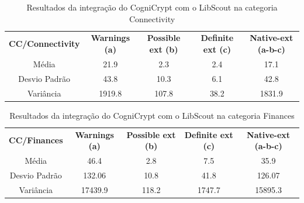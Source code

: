 \begin{table}[!htbp]
  \centering
  \small
  \begin{tabular}{|c|c|c|c|c|}
  
\textbf{CC/Connectivity}   & \textbf{Warnings (a)}   &  \textbf{Possible ext (b)}     &  \textbf{Definite ext (c)} &  \textbf{Native-ext (a-b-c)} \\ 
Média                      & \num{21.9}              &  \num{2.3}                                         & \num{2.4}                                        & \num{17.1}                                                    \\
Desvio Padrão              & \num{43.8}              &  \num{10.3}                                         & \num{6.1}                                        & \num{42.8}                                 \\                    
Variância                  & \num{1919.8}            &  \num{107.8}                                         & \num{38.2}                                       & \num{1831.9}         \\                                           
\end{tabular}
    
  \caption{Resultados da integração do CogniCrypt com o LibScout na categoria Connectivity}
\label{table: AplicativosComWarningCCC}
\end{table}


\begin{table}[!htbp]
  \centering
  \small
  \begin{tabular}{|c|c|c|c|c|}
  
\textbf{CC/Finances}   & \textbf{Warnings (a)}   &  \textbf{Possible ext (b)}     &  \textbf{Definite ext (c)} &  \textbf{Native-ext (a-b-c)} \\ 
Média                      & \num{46.4}          &  \num{2.8}                                                  & \num{7.5}                                         & \num{35.9}                                                    \\
Desvio Padrão              & \num{132.06}           &  \num{10.8}                                                 & \num{41.8}                                        & \num{126.07}          \\                                          
Variância                  & \num{17439.9}       &  \num{118.2}                                                & \num{1747.7}                                      & \num{15895.3}    \\                                                
\end{tabular}
    
  \caption{Resultados da integração do CogniCrypt com o LibScout na categoria Finances}
\label{table: AplicativosComWarningCCF}
\end{table}


